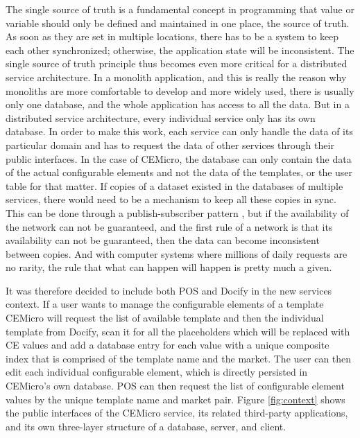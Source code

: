 The single source of truth \todo{[ref]} is a fundamental concept in programming that value or variable should only be defined and maintained in one place, the source of truth. As soon as they are set in multiple locations, there has to be a system to keep each other synchronized; otherwise, the application state will be inconsistent. The single source of truth principle thus becomes even more critical for a distributed service architecture. In a monolith application, and this is really the reason why monoliths are more comfortable to develop and more widely used, there is usually only one database, and the whole application has access to all the data. But in a distributed service architecture, every individual service only has its own database. In order to make this work, each service can only handle the data of its particular domain and has to request the data of other services through their public interfaces. In the case of CEMicro, the database can only contain the data of the actual configurable elements and not the data of the templates, or the user table for that matter. If copies of a dataset existed in the databases of multiple services, there would need to be a mechanism to keep all these copies in sync. This can be done through a publish-subscriber pattern \todo{[ref]}, but if the availability of the network can not be guaranteed, and the first rule of a network is that its availability can not be guaranteed, then the data can become inconsistent between copies. And with computer systems where millions of daily requests are no rarity, the rule that what can happen will happen is pretty much a given.

It was therefore decided to include both POS and Docify in the new services context. If a user wants to manage the configurable elements of a template CEMicro will request the list of available template and then the individual template from Docify, scan it for all the placeholders which will be replaced with CE values and add a database entry for each value with a unique composite index that is comprised of the template name and the market. The user can then edit each individual configurable element, which is directly persisted in CEMicro's own database. POS can then request the list of configurable element values by the unique template name and market pair. Figure \ref{fig:context} shows the public interfaces of the CEMicro service, its related third-party applications, and its own three-layer structure of a database, server, and client.

